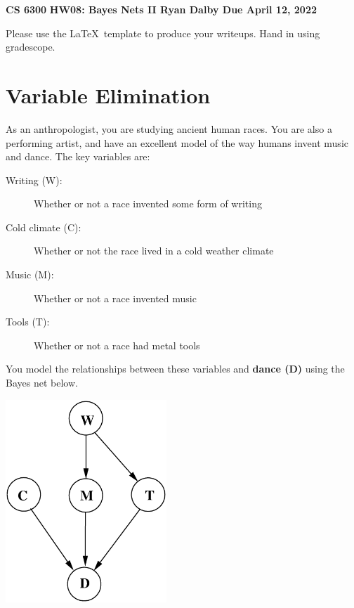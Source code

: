 \documentclass[12pt]{article}
\begin{document}
\begin{center}
{\bf CS 6300} \hfill {\large\bf HW08: Bayes Nets II \hfill {\bf Ryan Dalby} \hfill Due April 12, 2022}
\end{center}

\noindent
Please use the \LaTeX\ template to produce your writeups.  Hand in
using gradescope.

\section{Variable Elimination}

As an anthropologist, you are studying ancient human races.  You are
also a performing artist, and have an excellent model of the way
humans invent music and dance.  The key variables are:

\begin{description}

\item[Writing (W):] Whether or not a race invented some form of writing

\item[Cold climate (C):] Whether or not the race lived in a cold weather climate

\item[Music (M):] Whether or not a race invented music

\item[Tools (T):] Whether or not a race had metal tools

\end{description}

\noindent
You model the relationships between these variables and {\bf dance (D)}
using the Bayes net below.

\begin{center}
\includegraphics[height=3in]{dance1.eps}
\end{center}
\end{document}

